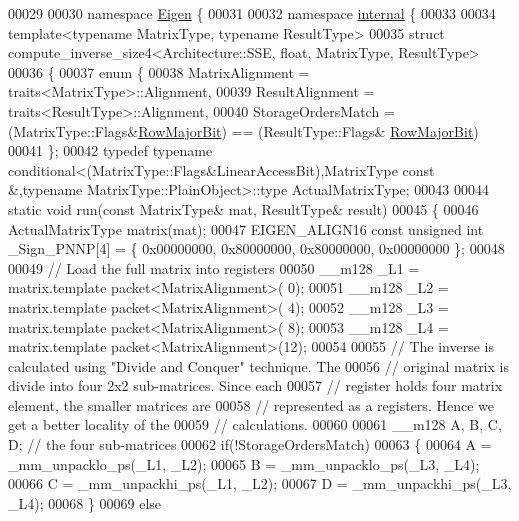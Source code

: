 \begin{DoxyCode}
00029 
00030 \textcolor{keyword}{namespace }\hyperlink{namespace_eigen}{Eigen} \{ 
00031 
00032 \textcolor{keyword}{namespace }\hyperlink{namespaceinternal}{internal} \{
00033 
00034 \textcolor{keyword}{template}<\textcolor{keyword}{typename} MatrixType, \textcolor{keyword}{typename} ResultType>
00035 \textcolor{keyword}{struct }compute\_inverse\_size4<Architecture::SSE, float, MatrixType, ResultType>
00036 \{
00037   \textcolor{keyword}{enum} \{
00038     MatrixAlignment     = traits<MatrixType>::Alignment,
00039     ResultAlignment     = traits<ResultType>::Alignment,
00040     StorageOrdersMatch  = (MatrixType::Flags&\hyperlink{group__flags_gae4f56c2a60bbe4bd2e44c5b19cbe8762}{RowMajorBit}) == (ResultType::Flags&
      \hyperlink{group__flags_gae4f56c2a60bbe4bd2e44c5b19cbe8762}{RowMajorBit})
00041   \};
00042   \textcolor{keyword}{typedef} \textcolor{keyword}{typename} conditional<(MatrixType::Flags&LinearAccessBit),MatrixType const &,typename
       MatrixType::PlainObject>::type ActualMatrixType;
00043   
00044   \textcolor{keyword}{static} \textcolor{keywordtype}{void} run(\textcolor{keyword}{const} MatrixType& mat, ResultType& result)
00045   \{
00046     ActualMatrixType matrix(mat);
00047     EIGEN\_ALIGN16 \textcolor{keyword}{const} \textcolor{keywordtype}{unsigned} \textcolor{keywordtype}{int} \_Sign\_PNNP[4] = \{ 0x00000000, 0x80000000, 0x80000000, 0x00000000 \};
00048 
00049     \textcolor{comment}{// Load the full matrix into registers}
00050     \_\_m128 \_L1 = matrix.template packet<MatrixAlignment>( 0);
00051     \_\_m128 \_L2 = matrix.template packet<MatrixAlignment>( 4);
00052     \_\_m128 \_L3 = matrix.template packet<MatrixAlignment>( 8);
00053     \_\_m128 \_L4 = matrix.template packet<MatrixAlignment>(12);
00054 
00055     \textcolor{comment}{// The inverse is calculated using "Divide and Conquer" technique. The}
00056     \textcolor{comment}{// original matrix is divide into four 2x2 sub-matrices. Since each}
00057     \textcolor{comment}{// register holds four matrix element, the smaller matrices are}
00058     \textcolor{comment}{// represented as a registers. Hence we get a better locality of the}
00059     \textcolor{comment}{// calculations.}
00060 
00061     \_\_m128 A, B, C, D; \textcolor{comment}{// the four sub-matrices}
00062     \textcolor{keywordflow}{if}(!StorageOrdersMatch)
00063     \{
00064       A = \_mm\_unpacklo\_ps(\_L1, \_L2);
00065       B = \_mm\_unpacklo\_ps(\_L3, \_L4);
00066       C = \_mm\_unpackhi\_ps(\_L1, \_L2);
00067       D = \_mm\_unpackhi\_ps(\_L3, \_L4);
00068     \}
00069     \textcolor{keywordflow}{else}

\end{DoxyCode}
